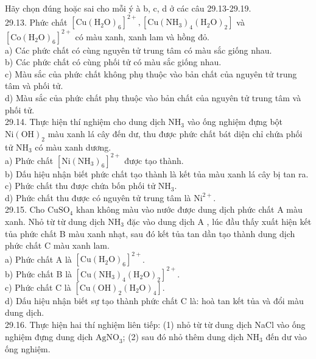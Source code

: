 \documentclass[10pt]{article}
\begin{document}
Hãy chọn đúng hoặc sai cho mỗi ý à b, c, d ở các câu 29.13-29.19.\\
29.13. Phức chất $\left[\mathrm{Cu}\left(\mathrm{H}_{2} \mathrm{O}\right)_{6}\right]^{2+},\left[\mathrm{Cu}\left(\mathrm{NH}_{3}\right)_{4}\left(\mathrm{H}_{2} \mathrm{O}\right)_{2}\right]$ và $\left[\mathrm{Co}\left(\mathrm{H}_{2} \mathrm{O}\right)_{6}\right]^{2+}$ có màu xanh, xanh lam và hồng đỏ.\\
a) Các phức chất có cùng nguyên tử trung tâm có màu sắc giống nhau.\\
b) Các phức chất có cùng phối tử có màu sắc giống nhau.\\
c) Màu sắc của phức chất không phụ thuộc vào bản chất của nguyên tử trung tâm và phối tử.\\
d) Màu sắc của phức chất phụ thuộc vào bản chất của nguyên tử trung tâm và phối tử.\\
29.14. Thực hiện thí nghiệm cho dung dịch $\mathrm{NH}_{3}$ vào ống nghiệm đựng bột $\mathrm{Ni}(\mathrm{OH})_{2}$ màu xanh lá cây đến dư, thu được phức chất bát diện chỉ chứa phối tử $\mathrm{NH}_{3}$ có màu xanh dương.\\
a) Phức chất $\left[\mathrm{Ni}\left(\mathrm{NH}_{3}\right)_{6}\right]^{2+}$ được tạo thành.\\
b) Dấu hiệu nhận biết phức chất tạo thành là kết tủa màu xanh lá cây bị tan ra.\\
c) Phức chất thu được chứa bốn phối tử $\mathrm{NH}_{3}$.\\
d) Phức chất thu được có nguyên tử trung tâm là $\mathrm{Ni}^{2+}$.\\
29.15. Cho $\mathrm{CuSO}_{4}$ khan không màu vào nước được dung dịch phức chất A màu xanh. Nhỏ từ từ dung dịch $\mathrm{NH}_{3}$ đặc vào dung dịch A , lúc đầu thấy xuất hiện kết tủa phức chất B màu xanh nhạt, sau đó kết tủa tan dần tạo thành dung dịch phức chất C màu xanh lam.\\
a) Phức chất A là $\left[\mathrm{Cu}\left(\mathrm{H}_{2} \mathrm{O}\right)_{6}\right]^{2+}$.\\
b) Phức chất B là $\left[\mathrm{Cu}\left(\mathrm{NH}_{3}\right)_{4}\left(\mathrm{H}_{2} \mathrm{O}\right)_{2}\right]^{2+}$.\\
c) Phức chất C là $\left[\mathrm{Cu}(\mathrm{OH})_{2}\left(\mathrm{H}_{2} \mathrm{O}\right)_{4}\right]$.\\
d) Dấu hiệu nhận biết sự tạo thành phức chất C là: hoà tan kết tủa và đổi màu dung dịch.\\
29.16. Thực hiện hai thí nghiệm liên tiếp: (1) nhỏ từ từ dung dịch NaCl vào ống nghiệm đựng dung dịch $\mathrm{AgNO}_{3}$; (2) sau đó nhỏ thêm dung dịch $\mathrm{NH}_{3}$ đến dư vào ống nghiệm.\\
\end{document}
